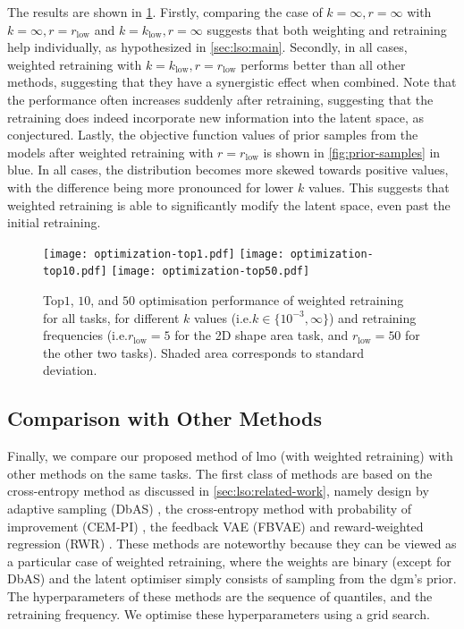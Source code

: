 The results are shown in \cref{fig:wr-params}.
Firstly, comparing the case of $k=\infty,r=\infty$ with $k=\infty,r=r_{\text{low}}$ and $k=k_{\text{low}},r=\infty$
suggests that both weighting and retraining help individually, as hypothesized in \cref{sec:lso:main}.
Secondly, in all cases, weighted retraining with $k=k_{\text{low}},r=r_{\text{low}}$ performs better than all other methods, suggesting that they have a synergistic effect when combined.
Note that the performance often increases suddenly after retraining,
suggesting that the retraining does indeed incorporate new information into the latent space, as conjectured.
Lastly, the objective function values of prior samples from the models after weighted retraining
with $r=r_{\text{low}}$ is shown in \cref{fig:prior-samples} in blue.
In all cases, the distribution becomes more skewed towards positive values, with the difference being more pronounced for lower $k$ values.
This suggests that weighted retraining is able to significantly modify the latent space, even past the initial retraining.

\begin{figure}[th]
    \centering
    \texttt{[image: optimization-top1.pdf]}
    \texttt{[image: optimization-top10.pdf]}
    \texttt{[image: optimization-top50.pdf]}
    \caption[Top$1$, $10$, and $50$ optimisation performance of weighted retraining for all tasks.]{
        Top$1$, $10$, and $50$ optimisation performance of weighted retraining for all tasks,
        for different $k$ values (i.e.\@ $k \in \{10^{-3}, \infty\}$)
        and retraining frequencies (i.e.\@ $r_\text{low} = 5$ for the 2D shape area task,
        and $r_\text{low} = 50$ for the other two tasks). Shaded area corresponds to standard deviation.
    }
    \label{fig:wr-params}
\end{figure}


\subsection{Comparison with Other Methods}
\label{subsec:expt-baselines}
Finally, we compare our proposed method of \gls{lmo} (with weighted retraining) with other methods on the same tasks.
The first class of methods are based on the cross-entropy method as discussed in \cref{sec:lso:related-work},
namely design by adaptive sampling (DbAS) \citep{Brookes_Listgarten_2020},
the cross-entropy method with probability of improvement (CEM-PI) \citep{rubinstein_cross-entropy_1999},
the feedback VAE (FBVAE) \citep{gupta_feedback_2019} and reward-weighted regression (RWR)
\citep{peters2007reinforcement}.
These methods are noteworthy because they can be viewed as a particular case of weighted retraining,
where the weights are binary (except for DbAS)
and the latent optimiser simply consists of sampling from the \gls{dgm}'s prior.
The hyperparameters of these methods are the sequence of quantiles, and the retraining frequency.
We optimise these hyperparameters using a grid search.

